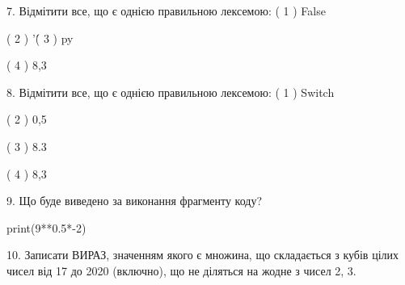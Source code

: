 \documentclass[11pt]{article}
\begin{document}
7. %
Відмітити все, що є однією правильною лексемою:
( 1 ) False

( 2 ) '\'

( 3 ) py

( 4 ) 8,3
\vspace{5mm}

8. %
Відмітити все, що є однією правильною лексемою:
( 1 ) Switch

( 2 ) 0,5

( 3 ) 8.3

( 4 ) 8,3
\vspace{5mm}

9. Що буде виведено за виконання фрагменту коду?

print(9**0.5*-2)
\vspace{5mm}

10. 
Записати ВИРАЗ, значенням якого є множина, що складається з кубів цілих чисел від 17 до 2020 (включно), що не діляться на жодне з чисел 2, 3.\vspace{5mm}

\newpage
\end{document}
